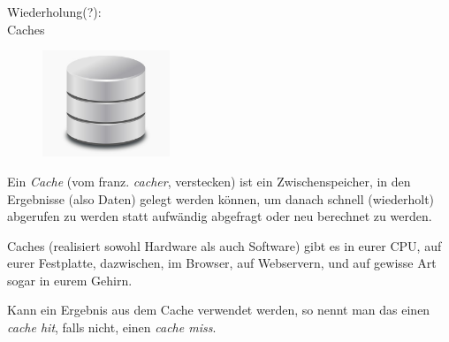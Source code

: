 \documentclass{beamer}
\begin{document}
\begin{frame}
\Large
\begin{center}
Wiederholung(?):\\
Caches
\end{center}
\normalsize
\end{frame}


\begin{frame}

\begin{figure}
\vspace{-25pt}
 \begin{center}
   \includegraphics[width=0.34\textwidth]{ce_cache__full.jpg}
 \end{center}
 \vspace{-30pt}
 \end{figure}

Ein \emph{Cache} (vom franz. \emph{cacher}, verstecken) ist ein Zwischenspeicher, in den Ergebnisse (also Daten) gelegt werden können, um danach schnell (wiederholt) abgerufen zu werden statt aufwändig abgefragt oder neu berechnet zu werden.
\pause
\bigskip

Caches (realisiert sowohl Hardware als auch Software) gibt es in eurer CPU, auf eurer Festplatte, dazwischen, im Browser, auf Webservern, und auf gewisse Art sogar in eurem Gehirn.
\pause
\bigskip

Kann ein Ergebnis aus dem Cache verwendet werden, so nennt man das einen \emph{cache hit}, falls nicht, einen \emph{cache miss}.
\end{frame}

\end{document}
